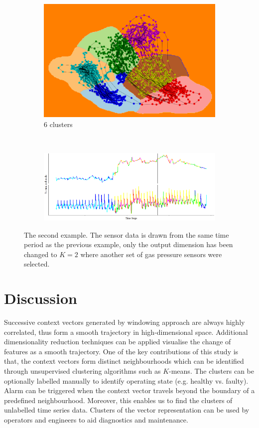 \documentclass[runningheads]{llncs}
\begin{document}
\begin{figure}[H]
	\begin{subfigure}[b]{0.35\textwidth}
		\includegraphics[width=\textwidth]{ex2_pca_cluster_6.PNG}
		\caption{\(6\) clusters}
		\label{fig:ex2_pca_cluster_6}
	\end{subfigure}
	~
	\begin{subfigure}[b]{0.6\textwidth}
		\includegraphics[width=\textwidth]{ex2_context_timeline_6.PNG}
		\label{fig:ex2_context_timeline_6}
	\end{subfigure}
	
	\caption{The second example. The sensor data is drawn from the same time period as the previous example, only the output dimension has been changed to \(K=2\) where another set of gas pressure sensors were selected. }
	\label{fig:ex2_pca_cluster}
\end{figure}


\section{Discussion}

Successive context vectors generated by windowing approach are always highly correlated, thus form a smooth trajectory in high-dimensional space. Additional dimensionality reduction techniques can be applied visualise the change of features as a smooth trajectory. One of the key contributions of this study is that, the context vectors form distinct neighbourhoods which can be identified through unsupervised clustering algorithms such as \(K\)-means. The clusters can be optionally labelled manually to identify operating state (e.g. healthy vs. faulty). Alarm can be triggered when the context vector travels beyond the boundary of a predefined neighbourhood. Moreover, this enables us to find the clusters of unlabelled time series data. Clusters of the vector representation can be used by operators and engineers to aid diagnostics and maintenance.
\end{document}
